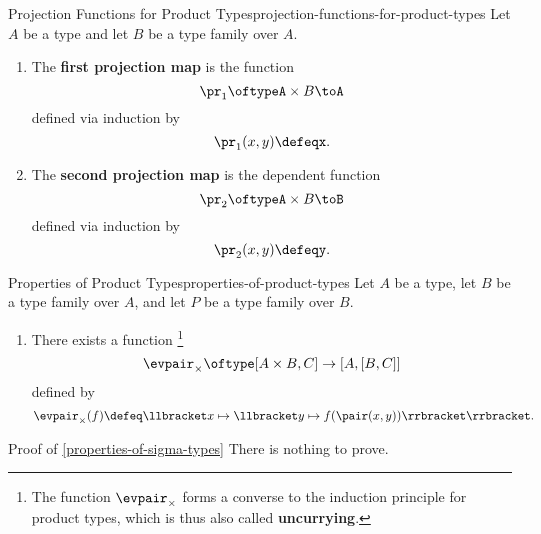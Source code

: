 \begin{definition}{Projection Functions for Product Types}{projection-functions-for-product-types}%
    Let $A$ be a type and let $B$ be a type family over $A$.
    \begin{enumerate}
        \item\label{projection-functions-for-product-types-the-first-projection-map}The \textbf{first projection map} is the function
            \[
                \pr_{1}%
                \oftype%
                A\times B
                \to%
                A%
            \]%
            defined via induction by
            \[
                \pr_{1}(x,y)%
                \defeq%
                x.%
            \]%
        \item\label{projection-functions-for-product-types-the-second-projection-map}The \textbf{second projection map} is the dependent function
            \[
                \pr_{2}%
                \oftype%
                A\times B
                \to%
                B%
            \]%
            defined via induction by
            \[
                \pr_{2}(x,y)%
                \defeq%
                y.%
            \]%
    \end{enumerate}
\end{definition}
\begin{proposition}{Properties of Product Types}{properties-of-product-types}%
    Let $A$ be a type, let $B$ be a type family over $A$, and let $P$ be a type family over $B$.
    \begin{enumerate}
        \item\label{properties-of-product-types-currying}There exists a function%
            \footnote{%
                The function $\evpair_{\times}$ forms a converse to the induction principle for product types, which is thus also called \textbf{uncurrying}.
                \par\vspace*{\TCBBoxCorrection}
            }%
            \[%
                \evpair_{\times}%
                \oftype%
                [A\times B,C]%
                \to
                [A,[B,C]]%
            \]%
            defined by
            \[
                \evpair_{\times}(f)%
                \defeq%
                \llbracket x\mapsto\llbracket y\mapsto f(\pair(x,y))\rrbracket\rrbracket.%
            \]%
    \end{enumerate}
\end{proposition}
\begin{Proof}{Proof of \cref{properties-of-sigma-types}}%
    There is nothing to prove.
\end{Proof}
